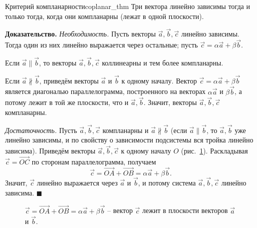 \documentclass[12pt,a4paper]{article}
\newenvironment{myproof}{\noindent\textbf{Доказательство.}}{\hfill$\blacksquare$}
\begin{document}
\begin{theorem}{Критерий компланарности}{coplanar_thm}
  Три вектора линейно зависимы тогда и только тогда, когда они
  компланарны (лежат в одной плоскости).
\end{theorem}

\begin{myproof}
  \textit{Необходимость.} Пусть векторы $\vec{a}, \vec{b}, \vec{c}$
  линейно зависимы. Тогда один из них линейно выражается через остальные;
  пусть $\vec{c} = \alpha\vec{a} + \beta\vec{b}$.

  Если $\vec{a} \parallel \vec{b}$, то векторы $\vec{a}, \vec{b}, \vec{c}$
  коллинеарны и тем более компланарны.

  Если $\vec{a} \nparallel \vec{b}$, приведём векторы $\vec{a}$ и
  $\vec{b}$ к одному началу. Вектор $\vec{c} = \alpha\vec{a} +
  \beta\vec{b}$ является диагональю параллелограмма, построенного на
  векторах $\alpha\vec{a}$ и $\beta\vec{b}$, а потому лежит в той же
  плоскости, что и $\vec{a}, \vec{b}$. Значит, векторы $\vec{a}, \vec{b},
  \vec{c}$ компланарны.

  \textit{Достаточность.} Пусть $\vec{a}, \vec{b}, \vec{c}$ компланарны и
  $\vec{a} \nparallel \vec{b}$ (если $\vec{a} \parallel \vec{b}$, то
    $\vec{a}, \vec{b}$ уже линейно зависимы, и по свойству о зависимости
  подсистемы вся тройка линейно зависима). Приведём векторы $\vec{a},
  \vec{b}, \vec{c}$ к одному началу $O$ (рис.~\ref{fig:coplanar}).
  Раскладывая $\vec{c} = \overrightarrow{OC}$ по сторонам
  параллелограмма, получаем
  \[
    \vec{c} = \overrightarrow{OA} + \overrightarrow{OB} =
    \alpha\vec{a} + \beta\vec{b}.
  \]
  Значит, $\vec{c}$ линейно выражается через $\vec{a}$ и $\vec{b}$, и
  потому система $\vec{a}, \vec{b}, \vec{c}$ линейно зависима.
\end{myproof}

\begin{figure}[h!]
  \centering
  \caption{$\vec{c} = \overrightarrow{OA} + \overrightarrow{OB} =
    \alpha\vec{a} + \beta\vec{b}$ -- вектор $\vec{c}$ лежит в плоскости
  векторов $\vec{a}$ и $\vec{b}$.}
  \label{fig:coplanar}
\end{figure}
\end{document}
